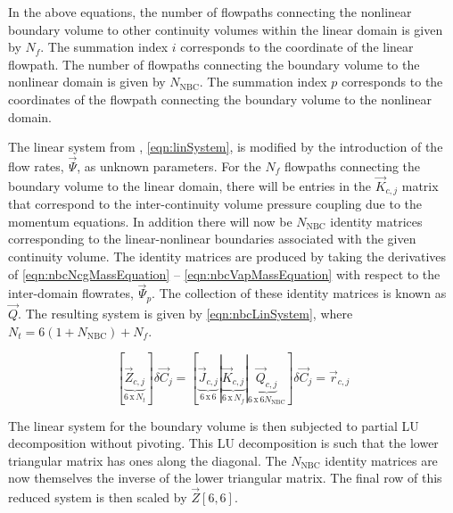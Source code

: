 In the above equations, the number of flowpaths connecting the nonlinear boundary volume to other continuity volumes within the linear domain is given by $N_{f}$.
The summation index $i$ corresponds to the coordinate of the linear flowpath.
The number of flowpaths connecting the boundary volume to the nonlinear domain is given by $N_{\text{NBC}}$.
The summation index $p$ corresponds to the coordinates of the flowpath connecting the boundary volume to the nonlinear domain.

The linear system from , \eqref{eqn:linSystem}, is modified by the introduction of the flow rates, $\vec{\Psi}$, as unknown parameters.
For the $N_{f}$ flowpaths connecting the boundary volume to the linear domain, there will be entries in the $\vec{K}_{c, j}$ matrix that correspond to the inter-continuity volume pressure coupling due to the momentum equations.
In addition there will now be $N_{\text{NBC}}$ identity matrices corresponding to the linear-nonlinear boundaries associated with the given continuity volume.
The identity matrices are produced by taking the derivatives of \eqref{eqn:nbcNcgMassEquation} -- \eqref{eqn:nbcVapMassEquation} with respect to the inter-domain flowrates, $\vec{\Psi}_{p}$.
The collection of these identity matrices is known as $\vec{Q}$.
The resulting system is given by \eqref{eqn:nbcLinSystem}, where $N_{t} = 6 \left( 1 + N_{\text{NBC}}\right) + N_{f}$.

\begin{equation}
\label{eqn:nbcLinSystem}
\left[\right.\underbrace{\vec{Z}_{c, j}}_{6\, \text{x}\, N_{t}}\left.\right] \delta \vec{C}_{j} = \left[\right.\underbrace{\vec{J}_{c, j}}_{6\, \text{x}\, 6}|\underbrace{\vec{K}_{c, j}}_{6\, \text{x}\, N_{f}}|{\underbrace{\vec{Q}_{c, j}}_{6\, \text{x}\, 6 N_{\text{NBC}}}}\left.\right]\delta \vec{C}_{j} = \vec{r}_{c,j}
\end{equation}

The linear system for the boundary volume is then subjected to partial LU decomposition without pivoting.
This LU decomposition is such that the lower triangular matrix has ones along the diagonal.
The $N_{\text{NBC}}$ identity matrices are now themselves the inverse of the lower triangular matrix.
The final row of this reduced system is then scaled by $\vec{Z}[6,6]$.

